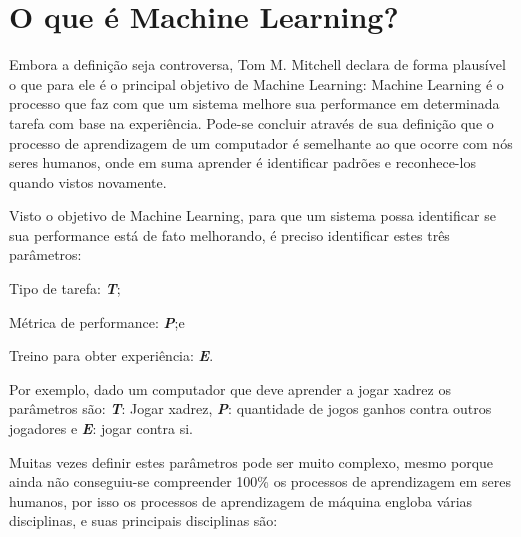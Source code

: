 \section{O que é Machine Learning?}
\label{sec:oqueemachinelearning}

Embora a definição seja controversa, Tom M. Mitchell declara de forma plausível o que para ele é o principal objetivo de Machine Learning: Machine Learning é o processo que faz com que um sistema melhore
sua performance em determinada tarefa com base na experiência\cite{Tom}. Pode-se concluir através de sua definição que o processo de aprendizagem de um 
computador é semelhante ao que ocorre com nós seres humanos, onde em suma aprender é identificar padrões e reconhece-los quando vistos novamente.

Visto o objetivo de Machine Learning, para que um sistema possa identificar se sua performance está de fato melhorando, é preciso identificar estes três parâmetros:
 \begin{alineascomponto}
	\item Tipo de tarefa: \textbf{\textit{T}};
	\item Métrica de performance: \textbf{\textit{P}};e
	\item Treino para obter experiência: \textbf{\textit{E}}.			
\end{alineascomponto}
Por exemplo, dado um computador que deve aprender a jogar xadrez os parâmetros são: \textbf{\textit{T}}: Jogar xadrez, \textbf{\textit{P}}: quantidade de jogos ganhos contra outros jogadores e
\textbf{\textit{E}}: jogar contra si.

Muitas vezes definir estes parâmetros pode ser muito complexo, mesmo porque ainda não conseguiu-se compreender 100\% os processos
de aprendizagem em seres humanos, por isso os processos de aprendizagem de máquina engloba várias disciplinas, e suas principais disciplinas são: 
 
